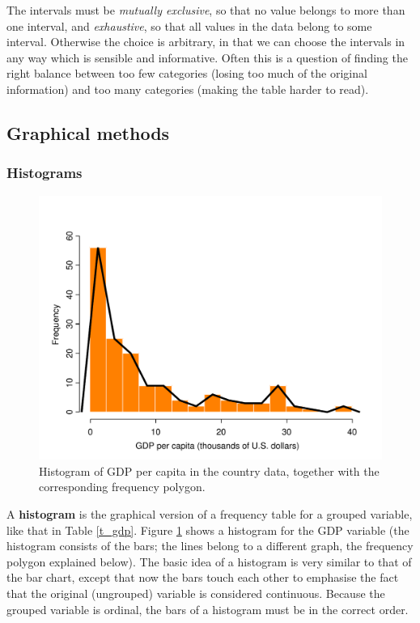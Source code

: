 The intervals must be \emph{mutually exclusive}, so that no value
belongs to more than one interval, and \emph{exhaustive}, so that all
values in the data belong to some interval. Otherwise the choice is
arbitrary, in that we can choose the intervals in any way which is
sensible and informative. Often this is a question of finding the
right balance between too few categories (losing too much of the
original information) and too many categories (making the table harder
to read).

\subsection{Graphical methods}
\label{ss_descr1_1cont_graphs}

\subsubsection{Histograms}

\begin{figure}
\caption{Histogram of GDP per capita in the country data, together with
the corresponding frequency polygon.}
\label{f_hist_gdp}
\begin{center}

\includegraphics[width=13.5cm]{gdp}
\end{center}
\end{figure}

A \textbf{histogram} is the graphical version of a frequency
table for a grouped variable, like that in Table \ref{t_gdp}. Figure
\ref{f_hist_gdp} shows a histogram for the GDP variable (the histogram
consists of the bars; the lines belong to a different graph, the
frequency polygon explained below). The basic idea of a histogram is
very similar to that of the bar chart, except that now the bars touch
each other to emphasise the fact that the original (ungrouped) variable
is considered continuous. Because the grouped variable is ordinal, the
bars of a histogram must be in the correct order.

